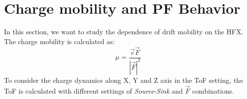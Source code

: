 \documentclass[%
 reprint,
superscriptaddress,
 amsmath,amssymb,
 aps,
prb,
floatfix
]{revtex4-2}
\begin{document}



\section{Charge mobility and PF Behavior}

In this section, we want to study the dependence of drift mobility on the HFX. The charge mobility is calculated as:
\begin{equation}
    \mu = \frac{\vec{v} \vec{F} }{ |\vec{F}|^2}
    \label{eq:mu}
\end{equation}
To consider the charge dynamics along X, Y and Z axis in the ToF setting, the ToF is calculated with different settings of \textit{Source}-\textit{Sink} and $\vec{F}$ combinations.
\end{document}
